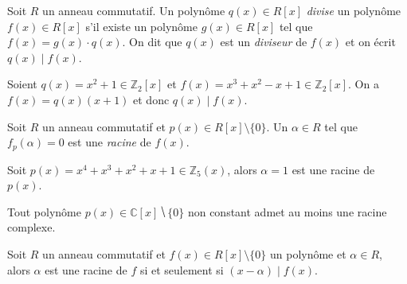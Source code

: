         
            
        
        




\begin{definition}
  \label{def:32}
  Soit $R$ un anneau commutatif. 
  Un polynôme  $q(x) ∈R[x]$ \emph{divise} un  polynôme $f(x)∈ R[x]$ s'il existe un polynôme $g(x)∈ R[x]$ tel que $f(x) = g(x) \cdot q(x)$. On dit que $q(x)$ est un \emph{diviseur} de $f(x)$ et on écrit $q(x) \mid f(x)$. 
\end{definition}


\begin{example}
  \label{exe:41}
  Soient $q(x) = x^2 +1 ∈ℤ_2[x]$ et $ f(x) = x^3 + x^2 - x+1 ∈ ℤ_2[x]$. On a
  $f(x) = q(x) (x+1)$ et donc 
   $q(x) \mid f(x)$. 
\end{example}


\begin{definition}
  \label{def:31}
  Soit $R$ un anneau commutatif et 
  $p(x) \in R[x] \setminus\{0\}$. Un $\alpha \in R$ tel que $f_p(\alpha) = 0$ est une  \emph{racine} de $f(x)$.  
\end{definition}


\begin{example}
  \label{exe:40}
  Soit $p(x) = x^4 + x^3 + x^2 + x + 1 ∈ ℤ_5(x)$, alors $α = 1$ est une racine de $p(x)$. 
\end{example}


\begin{theorem}
  \label{thr:44}
  Tout polynôme $p(x) ∈ℂ[x] ⧹\{0\}$ non constant admet au moins une racine complexe.
\end{theorem}




\begin{theorem}
  \label{thr:35}
  Soit $R$ un anneau commutatif et  $f(x)∈ R[x] \setminus \{0\}$ un polynôme  et $\alpha \in R$, alors $\alpha$ est une racine de $f$ si et seulement si $(x- \alpha)  \mid f(x)$. 
\end{theorem}

